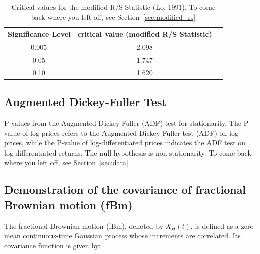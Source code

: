 \documentclass[11pt]{extarticle}
\begin{document}
\begin{table}[ht!]
\centering
\begin{tabular}{|c|c|c|}
\hline
\textbf{Significance Level} & \textbf{critical value (modified R/S Statistic)} \\
\hline
0.005 & 2.098\\
0.05 & 1.747\\
0.10 & 1.620\\

\hline
\end{tabular}
\caption{Critical values for the modified R/S Statistic (Lo, 1991). To come back where you left off, see Section~\ref{sec:modified_rs}}
    \label{table:critical_values}
\end{table}

\FloatBarrier

\subsection{Augmented Dickey-Fuller Test}

\begin{table}[h!]
    \centering
    \caption{P-values from the Augmented Dickey-Fuller (ADF) test for stationarity. The P-value of log prices refers to the Augmented Dickey Fuller test (ADF) on log prices,
     while the P-value of log-differentiated prices indicates the ADF test on log-differentiated returns. The null hypothesis is non-stationarity.
    To come back where you left off, see Section~\ref{sec:data}}
    \label{table:adf_results}
\end{table}

\FloatBarrier

\subsection{Demonstration of the covariance of fractional Brownian motion (fBm)}
\label{sec:covariance_fbm}

The fractional Brownian motion (fBm), denoted by \( X_H(t) \), is defined as a zero-mean continuous-time Gaussian process whose increments are correlated. Its covariance function is given by:
\end{document}
